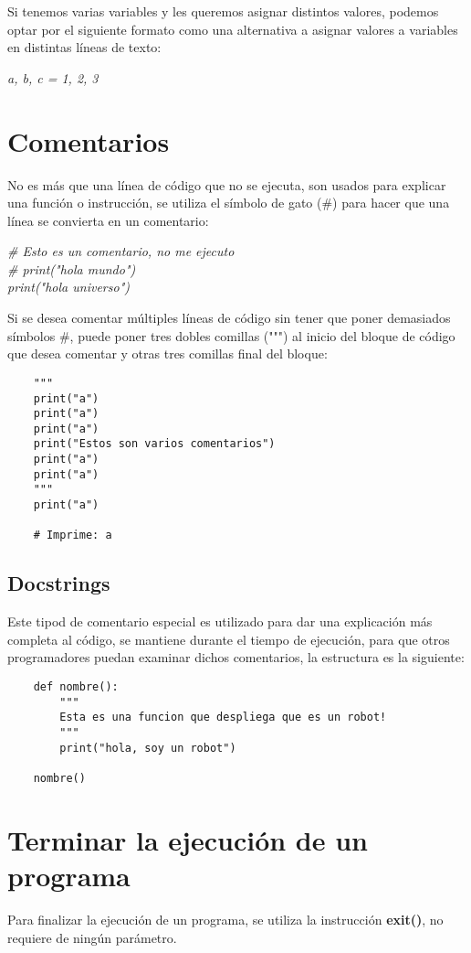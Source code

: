 Si tenemos varias variables y les queremos asignar distintos valores, podemos optar por el siguiente formato como una alternativa a asignar valores a variables en distintas líneas de texto:
\begin{center}
	\textit{a, b, c = 1, 2, 3}
\end{center}



\section{Comentarios}
\hspace{0.55cm}No es más que una línea de código que no se ejecuta, son usados para explicar una función o instrucción, se utiliza el símbolo de gato (\#) para hacer que una línea se convierta en un comentario:
\begin{center}
	\textit{\# Esto es un comentario, no me ejecuto\\\# print("hola mundo")\\print("hola universo")}
\end{center}

Si se desea comentar múltiples líneas de código sin tener que poner demasiados símbolos \#, puede poner tres dobles comillas (""") al inicio del bloque de código que desea comentar y otras tres comillas final del bloque:
\begin{lstlisting}
	"""
	print("a")
	print("a")
	print("a")
	print("Estos son varios comentarios")
	print("a")
	print("a")
	"""
	print("a")
	
	# Imprime: a
\end{lstlisting}


\subsection{Docstrings}
\hspace{0.55cm}Este tipod de comentario especial es utilizado para dar una explicación más completa al código, se mantiene durante el tiempo de ejecución, para que otros programadores puedan examinar dichos comentarios, la estructura es la siguiente:
\begin{lstlisting}
	def nombre():
		"""
		Esta es una funcion que despliega que es un robot!
		"""
		print("hola, soy un robot")
		
	nombre()
\end{lstlisting}



\section{Terminar la ejecución de un programa}
\hspace{0.55cm}Para finalizar la ejecución de un programa, se utiliza la instrucción \textbf{exit()}, no requiere de ningún parámetro.